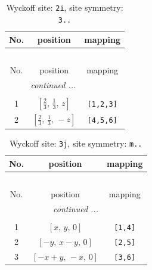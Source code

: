 \documentclass[fleqn,8pt]{jsarticle}
\begin{document}
\renewcommand{\arraystretch}{1.2}
\begin{longtable}{ccc}
\caption{Wyckoff site: {\tt 2i}, site symmetry: {\tt 3..}}
 \\
 \hline \hline
No. & position & mapping \\ \hline \endfirsthead

\multicolumn{2}{l}{\tablename\ \thetable{}} \\
 \hline \hline
No. & position & mapping \\ \hline \endhead

 \hline \hline
\multicolumn{2}{r}{\footnotesize\it continued ...} \\ \endfoot

 \hline \hline
\multicolumn{2}{r}{} \\ \endlastfoot

1 & $\left[ \frac{2}{3},\, \frac{1}{3},\, z \right]$ & {\tt [1,2,3]} \\ \hline
2 & $\left[ \frac{2}{3},\, \frac{1}{3},\, - z \right]$ & {\tt [4,5,6]} \\
\end{longtable}
\renewcommand{\arraystretch}{1.2}
\begin{longtable}{ccc}
\caption{Wyckoff site: {\tt 3j}, site symmetry: {\tt m..}}
 \\
 \hline \hline
No. & position & mapping \\ \hline \endfirsthead

\multicolumn{2}{l}{\tablename\ \thetable{}} \\
 \hline \hline
No. & position & mapping \\ \hline \endhead

 \hline \hline
\multicolumn{2}{r}{\footnotesize\it continued ...} \\ \endfoot

 \hline \hline
\multicolumn{2}{r}{} \\ \endlastfoot

1 & $\left[ x,\, y,\, 0 \right]$ & {\tt [1,4]} \\ \hline
2 & $\left[ - y,\, x - y,\, 0 \right]$ & {\tt [2,5]} \\ \hline
3 & $\left[ - x + y,\, - x,\, 0 \right]$ & {\tt [3,6]} \\
\end{longtable}
\renewcommand{\arraystretch}{1.2}
\end{document}

